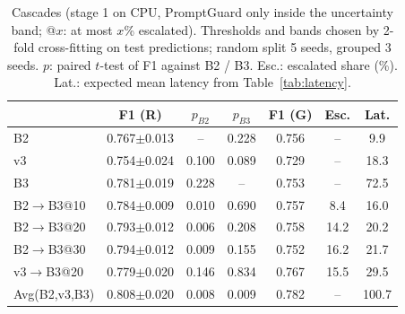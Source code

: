\begin{table}[t]
\centering
\caption{Cascades (stage 1 on CPU, PromptGuard only inside the uncertainty band; @$x$: at most $x$\% escalated). Thresholds and bands chosen by 2-fold cross-fitting on test predictions; random split 5 seeds, grouped 3 seeds. $p$: paired $t$-test of F1 against B2 / B3. Esc.: escalated share (\%). Lat.: expected mean latency from Table~\ref{tab:latency}.}
\label{tab:cascade}
\small
\setlength{\tabcolsep}{2pt}
\begin{tabular}{lcccccc}
\toprule
 & \textbf{F1 (R)} & $p_{B2}$ & $p_{B3}$ & \textbf{F1 (G)} & \textbf{Esc.} & \textbf{Lat.} \\
\midrule
B2 & 0.767$\pm$0.013 & -- & 0.228 & 0.756 & -- & 9.9 \\
v3 & 0.754$\pm$0.024 & 0.100 & 0.089 & 0.729 & -- & 18.3 \\
B3 & 0.781$\pm$0.019 & 0.228 & -- & 0.753 & -- & 72.5 \\
B2$\rightarrow$B3@10 & 0.784$\pm$0.009 & 0.010 & 0.690 & 0.757 & 8.4 & 16.0 \\
B2$\rightarrow$B3@20 & 0.793$\pm$0.012 & 0.006 & 0.208 & 0.758 & 14.2 & 20.2 \\
B2$\rightarrow$B3@30 & 0.794$\pm$0.012 & 0.009 & 0.155 & 0.752 & 16.2 & 21.7 \\
v3$\rightarrow$B3@20 & 0.779$\pm$0.020 & 0.146 & 0.834 & 0.767 & 15.5 & 29.5 \\
Avg(B2,v3,B3) & 0.808$\pm$0.020 & 0.008 & 0.009 & 0.782 & -- & 100.7 \\
\bottomrule
\end{tabular}
\end{table}
